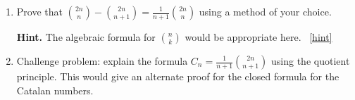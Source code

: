 \documentclass{book}
\begin{document}
\setcounter{project}{183}
\addtocounter{project}{-1}
\begin{activity}[]\label{activity-176}
\leavevmode%
\begin{enumerate}[font=\bfseries,label=(\alph*),ref=\alph*]
\item\label{task-197} \hypertarget{p-1052}{}%
Prove that \(\binom{2n}{n} - \binom{2n}{n+1} = \frac{1}{n+1}\binom{2n}{n}\) using a method of your choice.%
\par\smallskip%
\noindent\textbf{Hint.}\hypertarget{hint-124}{}\quad%
\hypertarget{p-1053}{}%
The algebraic formula for \(\binom{n}{k}\) would be appropriate here.%
~\hfill{\tiny\hyperlink{a-183.a}{[hint]}\hypertarget{q-183.a}{}}\item\label{task-198} \hypertarget{p-1054}{}%
Challenge problem: explain the formula \(C_n = \frac{1}{n+1}\binom{2n}{n+1}\) using the quotient principle.  This would give an alternate proof for the closed formula for the Catalan numbers.%
\end{enumerate}
\end{activity}

\clearpage
\end{document}
